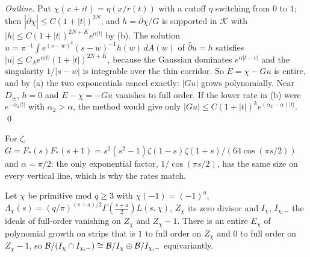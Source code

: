 \emph{Outline.} Put $\chi(x+it)=\eta(x/r(t))$ with a cutoff $\eta$ switching from $0$ to $1$; then $|\bar\partial\chi|\le C(1+|t|)^{2N}$, and $h=\bar\partial\chi/G$ is supported in $\mathcal{K}$ with $|h|\le C(1+|t|)^{2N+K}e^{\alpha|t|}$ by (b). The solution $u=\pi^{-1}\int e^{(s-w)^2}(s-w)^{-1}h(w)\,dA(w)$ of $\bar\partial u=h$ satisfies $|u|\le C_Ae^{\alpha|t|}(1+|t|)^{2N+K}$, because the Gaussian dominates $e^{\alpha|t-v|}$ and the singularity $1/|s-w|$ is integrable over the thin corridor. So $E=\chi-Gu$ is entire, and by (a) the two exponentials cancel exactly: $|Gu|$ grows polynomially. Near $D_\pm$, $h=0$ and $E-\chi=-Gu$ vanishes to full order. If the lower rate in (b) were $e^{-\alpha_2|t|}$ with $\alpha_2>\alpha$, the method would give only $|Gu|\le C(1+|t|)^ke^{(\alpha_2-\alpha)|t|}$. \qed

For $\zeta$, $G=F_*(s)F_*(s+1)=s^2(s^2-1)\zeta(1-s)\zeta(1+s)/(64\cos(\pi s/2))$ and $\alpha=\pi/2$: the only exponential factor, $1/\cos(\pi s/2)$, has the same size on every vertical line, which is why the rates match.

\begin{proposition}\label{prop:separatorL}
Let $\chi$ be primitive mod $q\ge3$ with $\chi(-1)=(-1)^a$, $\Lambda_\chi(s)=(q/\pi)^{(s+a)/2}\Gamma(\tfrac{s+a}2)L(s,\chi)$, $Z_\chi$ its zero divisor and $I_\chi$, $I_{\chi,-}$ the ideals of full-order vanishing on $Z_\chi$ and $Z_\chi-1$. There is an entire $E_\chi$ of polynomial growth on strips that is $1$ to full order on $Z_\chi$ and $0$ to full order on $Z_\chi-1$, so $\mathcal{B}/(I_\chi\cap I_{\chi,-})\cong\mathcal{B}/I_\chi\oplus\mathcal{B}/I_{\chi,-}$ equivariantly.
\end{proposition}

